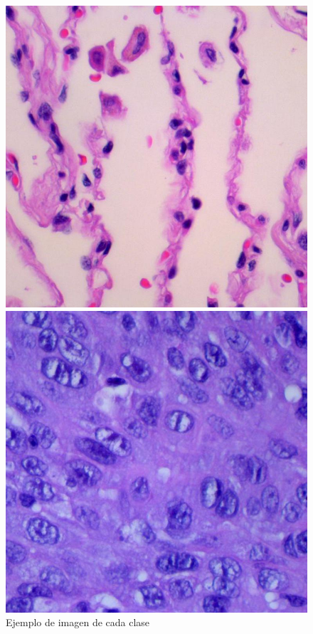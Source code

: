 \begin{figure}[h!]
\begin{minipage}{0.3\textwidth}
        \centering
        \includegraphics[width=\linewidth]{Francisco/Imagenes metodologia calisficacion/lungn1.jpeg} %
    \end{minipage}
    \hspace{0.5cm} %
    \begin{minipage}{0.3\textwidth} %
        \centering
        \includegraphics[width=\linewidth]{Francisco/Imagenes metodologia calisficacion/lungscc1.jpeg} %
    \end{minipage}
    
    \caption{Ejemplo de imagen de cada clase}
\end{figure}

